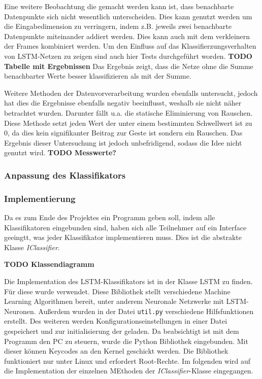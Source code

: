 Eine weitere Beobachtung die gemacht werden kann ist, dass benachbarte
Datenpunkte sich nicht wesentlich unterscheiden. Dies kann genutzt werden um die
Eingabedimension zu verringern, indem z.B. jeweils zwei benachbarte Datenpunkte
miteinander addiert werden. Dies kann auch mit dem verkleinern der Frames
kombiniert werden. Um den Einfluss auf das Klassifierzungsverhalten von
\ac{LSTM}-Netzen zu zeigen sind auch hier Tests durchgeführt worden.
\textbf{TODO Tabelle mit Ergebnissen} Das Ergebnis zeigt, dass die Netze ohne
die Summe benachbarter Werte besser klassifizieren als mit der Summe. 

Weitere Methoden der Datenvorverarbeitung wurden ebenfalls untersucht, jedoch
hat dies die Ergebnisse ebenfalls negativ beeinflusst, weshalb sie nicht näher
betrachtet wurden. Darunter fällt u.a. die statische Eliminierung von Rauschen.
Diese Methode setzt jeden Wert der unter einem bestimmten Schwellwert ist zu 0,
da dies kein signifikanter Beitrag zur Geste ist sondern ein Rauschen. Das
Ergebnis dieser Untersuchung ist jedoch unbefridigend, sodass die Idee nicht
genutzt wird. \textbf{TODO Messwerte?}
 


\subsubsection{Anpassung des Klassifikators}
\subsubsection{Implementierung}
Da es zum Ende des Projektes ein Programm geben soll, indem alle Klassifikatoren 
eingebunden sind, haben sich alle Teilnehmer auf ein Interface geeingtt, was 
jeder Klassifikator implementieren muss. Dies ist die abstrakte Klasse \textit{IClassifier}.

\textbf{TODO Klassendiagramm}

Die Implementation des \ac{LSTM}-Klassifikators ist in der Klasse LSTM zu finden.
Für diese wurde \cite{PyBrain} verwendet. Diese Bibliothek stellt verschiedene
Machine Learning Algorithmen bereit, unter anderem Neuronale Netzwerke mit 
\ac{LSTM}-Neuronen.
Außerdem wurden in der Datei \texttt{util.py} verschiedene Hilfsfunktionen
erstellt.
Des weiteren werden Konfigurationseinstellungen in einer Datei gespeichert und zur 
initialisierung der geladen. 
Da beabsichtigt ist mit dem Programm den PC zu steuern, wurde die Python Bibliothek 
\cite{Python-uinput} eingebunden. Mit dieser können Keycodes an den Kernel geschickt werden.
Die Bibliothek funktioniert nur unter Linux und erfordert Root-Rechte.
Im folgenden wird auf die Implementation der einzelnen MEthoden der 
\textit{IClassifier}-Klasse eingegangen.

